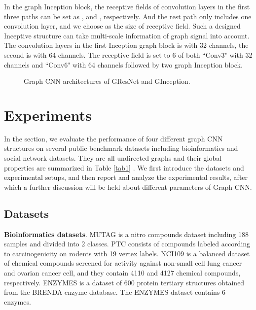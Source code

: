\documentclass[journal]{IEEEtran}
\begin{document}
In the graph Inception block, the receptive fields of convolution layers in the first three paths can be set as ,  and , respectively. And the rest path only includes one convolution layer, and we choose  as the size of receptive field.
Such a designed Inceptive structure can take multi-scale information of graph signal into account. The convolution layers in the first Inception graph block is with 32 channels, the second is with 64 channels. The receptive field is set to 6 of both ``Conv3" with 32 channels and ``Conv6" with 64 channels followed by two graph Inception block.

\begin{figure}[t]
	\centering
	\vspace{-1em}
	\caption{Graph CNN architectures of G\underline{\hspace{0.5em}}ResNet and G\underline{\hspace{0.5em}}Inception.}
	\label{sturcture2}
\end{figure}


\section{Experiments}
\label{sec:exp}
In the section, we evaluate the performance of four different graph CNN structures on several public benchmark datasets including bioinformatics and social network datasets. They are all undirected graphs and their global properties are summarized in Table \ref{tab1}  \cite{DyGraph2017}. We first introduce the datasets and experimental setups, and then report and analyze the experimental results, after which a further discussion will be held about different parameters of Graph CNN.


\subsection{Datasets}
\textbf{Bioinformatics datasets}.
MUTAG \cite{mutag} is a nitro compounds dataset including 188 samples and divided into 2 classes.
PTC \cite{ptc} consists of compounds labeled according to carcinogenicity on rodents with 19 vertex labels.
NCI109 \cite{nci1andnci109} is a balanced dataset of chemical compounds screened for activity against non-small cell lung cancer and ovarian cancer cell, and they contain 4110 and 4127 chemical compounds, respectively.
ENZYMES \cite{enzymes} is a dataset of 600 protein tertiary structures obtained from the BRENDA enzyme database. The ENZYMES dataset contains 6 enzymes.
\end{document}
